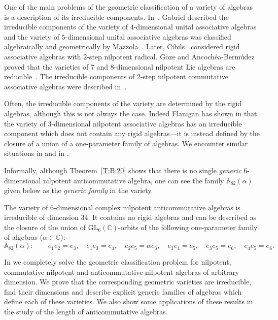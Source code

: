 \documentclass{commat}
\begin{document}
One of the main problems of the geometric classification of a variety of algebras is a description of its irreducible components. In~\cite{pG74}, Gabriel described the irreducible components of the variety of $4$-dimensional unital associative algebras and the variety of $5$-dimensional unital associative algebras was classified algebraically and geometrically by Mazzola~\cite{gM79}. Later, Cibils~\cite{cC87} considered rigid associative algebras with $2$-step nilpotent radical. Goze and Ancoch\'{e}a-Berm\'{u}dez proved that the varieties of $7$ and  $8$-dimensional nilpotent Lie algebras are reducible~\cite{GAB92}. The irreducible components of $2$-step nilpotent commutative associative algebras were described in~\cite{iS90}.


Often, the irreducible components of the variety are determined by the rigid algebras, although this is not always the case. Indeed Flanigan has shown in \cite{fF68} that the variety of $3$-dimensional nilpotent associative algebras has an irreducible component which does not contain any rigid algebras---it is instead defined by the closure of a union of a one-parameter family of algebras. 
We encounter similar situations in \cite{KKL20} and in \cite{KKL23}. 

Informally, although Theorem~\ref{T:B:20} shows that there is no single {\it generic} $6$-dimensional nilpotent anticommutative algebra, one can see the family ${\mathbb A}_{82}(\alpha)$ given below as the {\it generic family} in the variety. 

\begin{theorem}\label{T:B:20}
	The variety of $6$-dimensional complex nilpotent anticommutative algebras is irreducible of dimension $34$. It contains no rigid algebras and can be described as the closure of the union of $\mathrm{GL}_6(\mathbb{C})$-orbits of the following one-parameter family of algebras ($\alpha\in\mathbb{C}$):
	\begin{equation*}
		{\mathbb A}_{82}(\alpha) :\qquad   
		e_1e_2=e_3, \quad e_1e_3=e_4, \quad e_2e_5=\alpha e_6, \quad e_3e_4=e_5, \quad e_3e_5=e_6, \quad e_4e_5=e_6 .
	\end{equation*} 
\end{theorem}

In \cite{KKL23} we completely solve the geometric classification problem for nilpotent, commutative nilpotent and anticommutative nilpotent algebras of arbitrary dimension. We prove that the corresponding geometric varieties are irreducible, find their dimensions and describe explicit generic families of algebras which define each of these varieties. We also show some applications of these results in the study of the length of anticommutative algebras.
\end{document}
